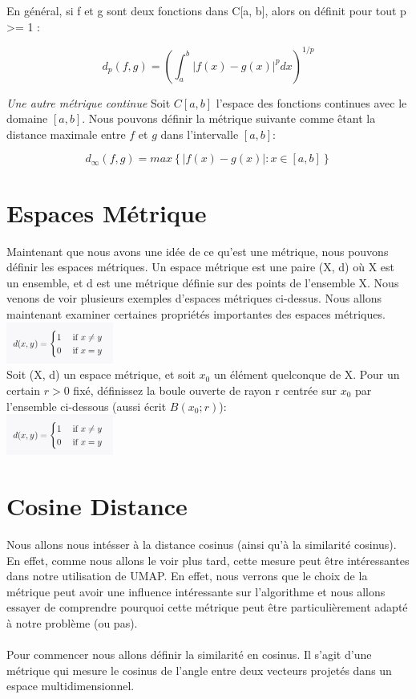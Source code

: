 En général, si f et g sont deux fonctions dans C[a, b], alors on définit pour tout p >= 1 :

$$ d_p(f,g) = (\int_a^b  \lvert f(x) - g(x) \rvert ^p dx)^{1/p}$$

\textit{Une autre métrique continue}
Soit $C[a, b]$ l'espace des fonctions continues avec le domaine $[a, b]$. Nous pouvons définir la métrique suivante comme êtant la distance maximale entre $f$ et $g$ dans l'intervalle $[a, b] $: 

$$ d_\infty(f,g) = max \left\{  \lvert f(x) - g(x) \rvert : x \in [a,b] \right\}
$$

    
\section*{Espaces Métrique}
Maintenant que nous avons une idée de ce qu'est une métrique, nous pouvons définir les espaces métriques. Un espace métrique est une paire (X, d) où X est un ensemble, et d est une métrique définie sur des points de l'ensemble X. Nous venons de voir plusieurs exemples d'espaces métriques ci-dessus. Nous allons maintenant examiner certaines propriétés importantes des espaces métriques.
\\
\includegraphics[width=100pt]{./img/notions_math/metric/metric_discret.png}
\\
Soit (X, d) un espace métrique, et soit $x_0$ un élément quelconque de X. Pour un certain $r > 0$ fixé, définissez la boule ouverte de rayon r centrée sur $x_0$ par l'ensemble ci-dessous (aussi écrit $B(x_0 ; r)$): 
\\
\includegraphics[width=100pt]{./img/notions_math/metric/metric_discret.png}



\section*{Cosine Distance}
Nous allons nous intésser à la distance cosinus (ainsi  qu'à la similarité cosinus). En effet, comme nous allons le  voir plus tard, cette mesure peut être intéressantes dans notre utilisation de UMAP. En effet, nous verrons que le choix de la métrique peut avoir une influence intéressante sur l'algorithme et nous allons essayer de comprendre pourquoi cette métrique peut être particulièrement adapté à notre problème (ou pas).
\\
\\
Pour commencer nous allons définir la similarité en cosinus. Il s'agit d'une métrique qui mesure le cosinus de l'angle entre deux vecteurs projetés dans un espace multidimensionnel.


